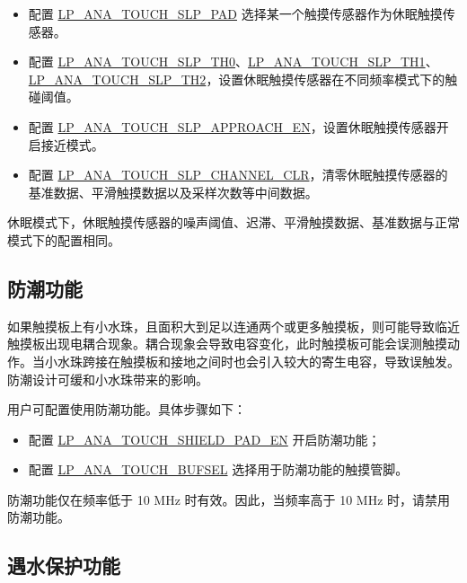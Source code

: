 \documentclass[main\_\_CN.tex]{subfiles}
\begin{document}
\begin{itemize}
    \item 配置 \hyperref[fielddesc:LPANATOUCHSLPPAD]{LP\_ANA\_TOUCH\_SLP\_PAD} 选择某一个触摸传感器作为休眠触摸传感器。
    \item 配置 \hyperref[fielddesc:LPANATOUCHSLPTH0]{LP\_ANA\_TOUCH\_SLP\_TH0}、\hyperref[fielddesc:LPANATOUCHSLPTH0]{LP\_ANA\_TOUCH\_SLP\_TH1}、\hyperref[fielddesc:LPANATOUCHSLPTH0]{LP\_ANA\_TOUCH\_SLP\_TH2}，设置休眠触摸传感器在不同频率模式下的触碰阈值。
    \item 配置 \hyperref[fielddesc:LPANATOUCHSLPAPPROACHEN]{LP\_ANA\_TOUCH\_SLP\_APPROACH\_EN}，设置休眠触摸传感器开启接近模式。
    \item 配置 \hyperref[fielddesc:LPANATOUCHSLPCHANNELCLR]{LP\_ANA\_TOUCH\_SLP\_CHANNEL\_CLR}，清零休眠触摸传感器的基准数据、平滑触摸数据以及采样次数等中间数据。
\end{itemize}

\begin{tiplisting}
休眠模式下，休眠触摸传感器的噪声阈值、迟滞、平滑触摸数据、基准数据与正常模式下的配置相同。
\end{tiplisting}

\subsection{防潮功能}

如果触摸板上有小水珠，且面积大到足以连通两个或更多触摸板，则可能导致临近触摸板出现电耦合现象。耦合现象会导致电容变化，此时触摸板可能会误测触摸动作。当小水珠跨接在触摸板和接地之间时也会引入较大的寄生电容，导致误触发。防潮设计可缓和小水珠带来的影响。

用户可配置使用防潮功能。具体步骤如下：

\begin{itemize}
    \item 配置 \hyperref[fielddesc:LPANATOUCHSHIELDPADEN]{LP\_ANA\_TOUCH\_SHIELD\_PAD\_EN} 开启防潮功能；
    \item 配置 \hyperref[fielddesc:LPANATOUCHBUFSEL]{LP\_ANA\_TOUCH\_BUFSEL} 选择用于防潮功能的触摸管脚。
\end{itemize}

\begin{tiplisting}
防潮功能仅在频率低于 10 MHz 时有效。因此，当频率高于 10 MHz 时，请禁用防潮功能。
\end{tiplisting}

\subsection{遇水保护功能}
\label{sec:tchsen-water-reject}
\end{document}
